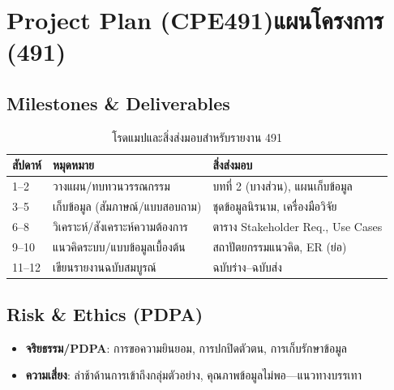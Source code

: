 \section{\ifenglish Project Plan (CPE491)\else แผนโครงการ (491)\fi}
\subsection*{Milestones \& Deliverables}
\begin{table}[h]
\centering
\begin{tabular}{@{}lll@{}}
\toprule
\textbf{สัปดาห์} & \textbf{หมุดหมาย} & \textbf{สิ่งส่งมอบ} \\
\midrule
1–2 & วางแผน/ทบทวนวรรณกรรม & บทที่ 2 (บางส่วน), แผนเก็บข้อมูล \\
3–5 & เก็บข้อมูล (สัมภาษณ์/แบบสอบถาม) & ชุดข้อมูลนิรนาม, เครื่องมือวิจัย \\
6–8 & วิเคราะห์/สังเคราะห์ความต้องการ & ตาราง Stakeholder Req., Use Cases \\
9–10 & แนวคิดระบบ/แบบข้อมูลเบื้องต้น & สถาปัตยกรรมแนวคิด, ER (ย่อ) \\
11–12 & เขียนรายงานฉบับสมบูรณ์ & ฉบับร่าง–ฉบับส่ง \\
\bottomrule
\end{tabular}
\caption{โรดแมปและสิ่งส่งมอบสำหรับรายงาน 491}
\label{tab:roadmap-491}
\end{table}

\subsection*{Risk \& Ethics (PDPA)}
\begin{itemize}
  \item \textbf{จริยธรรม/PDPA}: การขอความยินยอม, การปกปิดตัวตน, การเก็บรักษาข้อมูล
  \item \textbf{ความเสี่ยง}: ล่าช้าด้านการเข้าถึงกลุ่มตัวอย่าง, คุณภาพข้อมูลไม่พอ—แนวทางบรรเทา
\end{itemize}

